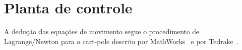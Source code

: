 \documentclass[brazil, 12pt]{article}
\begin{document}
\section{Planta de controle}

A dedução das equações de movimento segue o procedimento de Lagrange/Newton
para o cart-pole descrito por MathWorks~\cite{mathworks} e por
Tedrake~\cite{mit}.


\vspace{0.4cm}
\end{document}

